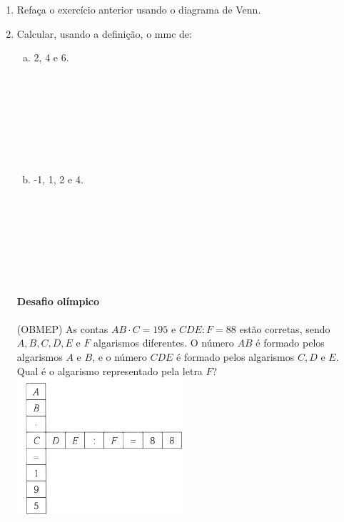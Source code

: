 \documentclass[a4paper,14pt]{article}
\begin{document}
\begin{multicols}{2}
\begin{enumerate}
\begin{enumerate}[a)]
			\end{enumerate}
			\item Refaça o exercício anterior usando o diagrama de Venn. \newpage
			\item Calcular, usando a definição, o mmc de:
			\begin{enumerate}[a)]
				\item 2, 4 e 6. \\\\\\\\\\\\\\\\
				\item -1, 1, 2 e 4. \\\\\\\\\\\\\\\\
			\end{enumerate}
			\textbf{Desafio olímpico} \\\\
			(OBMEP) As contas $AB \cdot C = 195$ e $CDE : F = 88$ estão corretas, sendo $A, B, C, D, E$ e $F$ algarismos diferentes. O número $AB$ é formado pelos algarismos $A$ e $B$, e o número $CDE$ é formado pelos algarismos $C, D$ e $E$. Qual é o algarismo representado pela letra $F$? \\
			\includegraphics[width=1\linewidth]{6FMA141_imagens/imagem1}

\end{enumerate}
\end{multicols}
\end{document}
